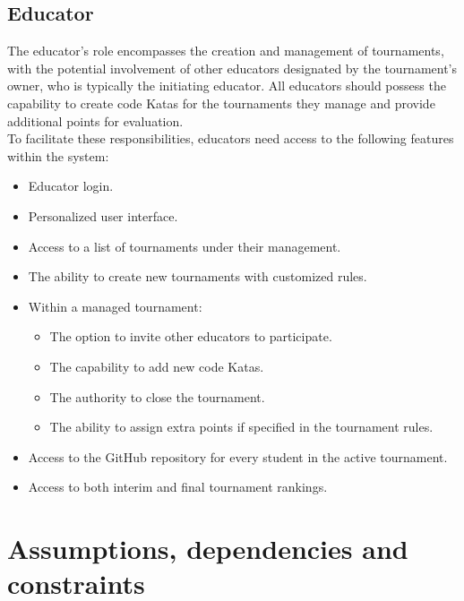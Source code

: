 \documentclass[12pt, a4paper]{report}
\begin{document}
    \subsection{Educator}
    The educator's role encompasses the creation and management of tournaments, with the potential involvement of other educators designated by the tournament's owner, 
    who is typically the initiating educator. All educators should possess the capability to create code Katas for the tournaments they manage and provide additional 
    points for evaluation. \\
    To facilitate these responsibilities, educators need access to the following features within the system:
    \begin{itemize}
        \item Educator login. 
        \item Personalized user interface. 
        \item Access to a list of tournaments under their management.
        \item The ability to create new tournaments with customized rules. 
        \item Within a managed tournament: 
            \begin{itemize}
                \item The option to invite other educators to participate. 
                \item The capability to add new code Katas.
                \item The authority to close the tournament.
                \item The ability to assign extra points if specified in the tournament rules.
            \end{itemize}
        \item Access to the GitHub repository for every student in the active tournament.
        \item Access to both interim and final tournament rankings.
    \end{itemize}

    \section{Assumptions, dependencies and constraints}
\end{document}
